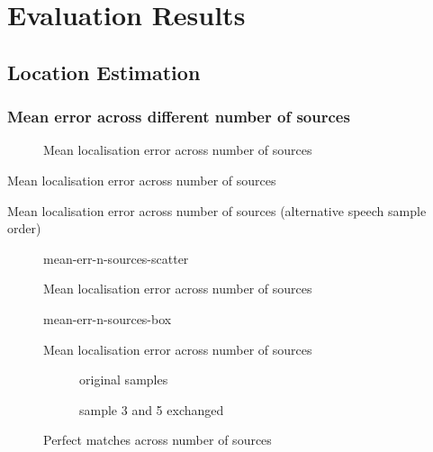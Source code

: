 \chapter{Evaluation Results}
\label{chap:results}

\section{Location Estimation}
\subsection*{Mean error across different number of sources}

\begin{figure}[H]
	\centering
		
	\caption{Mean localisation error across number of sources}
\end{figure}

\begin{table}[H]
	\centering
	
	\caption{Mean localisation error across number of sources}
\end{table}

\begin{table}[H]
	\centering
	
	\caption{Mean localisation error across number of sources (alternative speech sample order)}
\end{table}


\begin{figure}[H]
	\centering
	{mean-err-n-sources-scatter}
	\caption{Mean localisation error across number of sources}
\end{figure}

\begin{figure}[H]
	\centering
	{mean-err-n-sources-box}
	\caption{Mean localisation error across number of sources}
\end{figure}

\begin{figure}[H]
	\centering
	\begin{subfigure}{0.49\textwidth}
		\centering
			
		\caption{original samples}
	\end{subfigure}
	\begin{subfigure}{0.49\textwidth}
		\centering
			
		\caption{sample 3 and 5 exchanged}
	\end{subfigure}
	\caption{Perfect matches across number of sources}
	\label{fig:perfect}
\end{figure}

